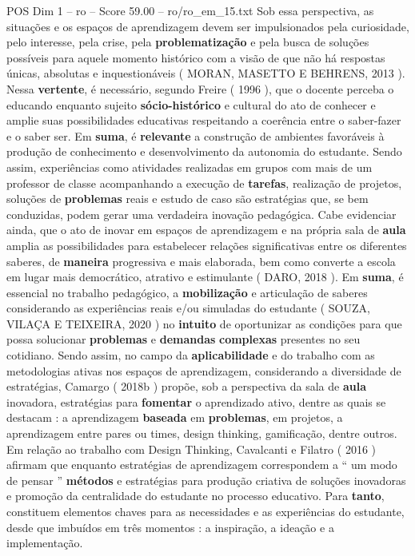 \begin{textsample}{POS Dim 1 – ro – Score 59.00 – ro/ro\_em\_15.txt}
Sob essa perspectiva, as situações e os espaços de aprendizagem devem ser impulsionados pela curiosidade, pelo interesse, pela crise, pela \textbf{problematização} e pela busca de soluções possíveis para aquele momento histórico com a visão de que não há respostas únicas, absolutas e inquestionáveis ( MORAN, MASETTO E BEHRENS, 2013 ).
Nessa \textbf{vertente}, é necessário, segundo Freire ( 1996 ), que o docente perceba o educando enquanto sujeito \textbf{sócio-histórico} e cultural do ato de conhecer e amplie suas possibilidades educativas respeitando a coerência entre o saber-fazer e o saber ser.
Em \textbf{suma}, é \textbf{relevante} a construção de ambientes favoráveis à produção de conhecimento e desenvolvimento da autonomia do estudante.
Sendo assim, experiências como atividades realizadas em grupos com mais de um professor de classe acompanhando a execução de \textbf{tarefas}, realização de projetos, soluções de \textbf{problemas} reais e estudo de caso são estratégias que, se bem conduzidas, podem gerar uma verdadeira inovação pedagógica.
Cabe evidenciar ainda, que o ato de inovar em espaços de aprendizagem e na própria sala de \textbf{aula} amplia as possibilidades para estabelecer relações significativas entre os diferentes saberes, de \textbf{maneira} progressiva e mais elaborada, bem como converte a escola em lugar mais democrático, atrativo e estimulante ( DARO, 2018 ).
Em \textbf{suma}, é essencial no trabalho pedagógico, a \textbf{mobilização} e articulação de saberes considerando as experiências reais e/ou simuladas do estudante ( SOUZA, VILAÇA E TEIXEIRA, 2020 ) no \textbf{intuito} de oportunizar as condições para que possa solucionar \textbf{problemas} e \textbf{demandas} \textbf{complexas} presentes no seu cotidiano.
Sendo assim, no campo da \textbf{aplicabilidade} e do trabalho com as metodologias ativas nos espaços de aprendizagem, considerando a diversidade de estratégias, Camargo ( 2018b ) propõe, sob a perspectiva da sala de \textbf{aula} inovadora, estratégias para \textbf{fomentar} o aprendizado ativo, dentre as quais se destacam : a aprendizagem \textbf{baseada} em \textbf{problemas}, em projetos, a aprendizagem entre pares ou times, design thinking, gamificação, dentre outros.
Em relação ao trabalho com Design Thinking, Cavalcanti e Filatro ( 2016 ) afirmam que enquanto estratégias de aprendizagem correspondem a “ um modo de pensar ” \textbf{métodos} e estratégias para produção criativa de soluções inovadoras e promoção da centralidade do estudante no processo educativo.
Para \textbf{tanto}, constituem elementos chaves para as necessidades e as experiências do estudante, desde que imbuídos em três momentos : a inspiração, a ideação e a implementação.

\end{textsample}
